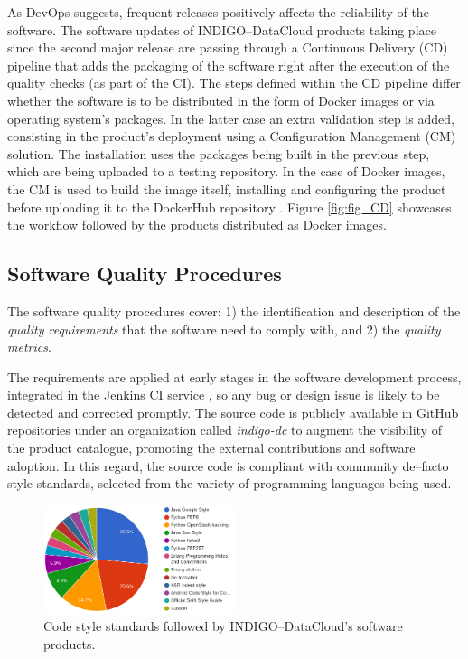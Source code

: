 \documentclass[journal]{IEEEtran}
\begin{document}
As DevOps suggests, frequent releases positively affects the reliability of the
software. The software updates of INDIGO--DataCloud products taking place since
the second major release are passing through a Continuous Delivery (CD)
pipeline that adds the packaging of the software right after the execution of
the quality checks (as part of the CI). The steps defined within the CD
pipeline differ whether the software is to be distributed in the form of Docker
images or via operating system’s packages. In the latter case an extra
validation step is added, consisting in the product’s deployment using a
Configuration Management (CM) solution. The installation uses the packages
being built in the previous step, which are being uploaded to a testing
repository. In the case of Docker images, the CM is used to build the image
itself, installing and configuring the product before uploading it to the
DockerHub repository \cite{indigo-dockerhub}. Figure \ref{fig:fig_CD} showcases
the workflow followed by the products distributed as Docker images.

\subsection{Software Quality Procedures}

The software quality procedures \cite{indigo-d31} cover: 1) the identification
and description of the \emph{quality requirements} that the software need to
comply with, and 2) the \emph{quality metrics}.

The requirements are applied at early stages in the software development
process, integrated in the Jenkins CI service \cite{indigo-jenkins}, so any
bug or design issue is likely to be detected and corrected promptly. The source
code is publicly available in GitHub repositories under an organization called
{\sl indigo-dc} \cite{indigo-github} to augment the visibility of the product
catalogue, promoting the external contributions and software adoption. In this
regard, the source code is compliant with community de--facto style standards,
selected from the variety of programming languages being used.

\begin{figure}[!t]
\centering
\includegraphics[width=0.5\textwidth]{images/codestyle.png}
\caption{Code style standards followed by INDIGO--DataCloud's software products.}
\label{fig:fig_codestyle}
\end{figure}
\end{document}
